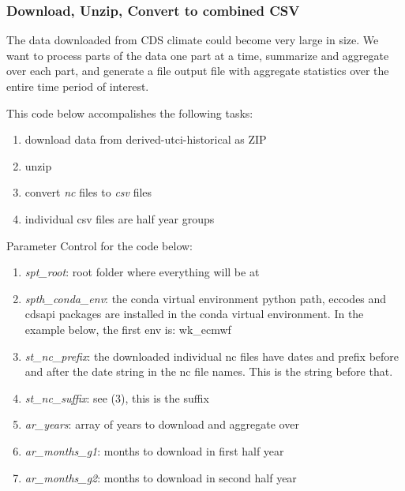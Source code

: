 \documentclass[
]{book}
\providecommand{\tightlist}{%
  \setlength{\itemsep}{0pt}\setlength{\parskip}{0pt}}
\begin{document}
\hypertarget{download-unzip-convert-to-combined-csv}{%
\subsubsection{Download, Unzip, Convert to combined CSV}\label{download-unzip-convert-to-combined-csv}}

The data downloaded from CDS climate could become very large in size. We want to process parts of the data one part at a time, summarize and aggregate over each part, and generate a file output file with aggregate statistics over the entire time period of interest.

This code below accompalishes the following tasks:

\begin{enumerate}
\def\labelenumi{\arabic{enumi}.}
\tightlist
\item
  download data from derived-utci-historical as ZIP
\item
  unzip
\item
  convert \emph{nc} files to \emph{csv} files
\item
  individual csv files are half year groups
\end{enumerate}

Parameter Control for the code below:

\begin{enumerate}
\def\labelenumi{\arabic{enumi}.}
\tightlist
\item
  \emph{spt\_root}: root folder where everything will be at
\item
  \emph{spth\_conda\_env}: the conda virtual environment python path, eccodes and cdsapi packages are installed in the conda virtual environment. In the example below, the first env is: wk\_ecmwf
\item
  \emph{st\_nc\_prefix}: the downloaded individual nc files have dates and prefix before and after the date string in the nc file names. This is the string before that.
\item
  \emph{st\_nc\_suffix}: see (3), this is the suffix
\item
  \emph{ar\_years}: array of years to download and aggregate over
\item
  \emph{ar\_months\_g1}: months to download in first half year
\item
  \emph{ar\_months\_g2}: months to download in second half year
\end{enumerate}
\end{document}

